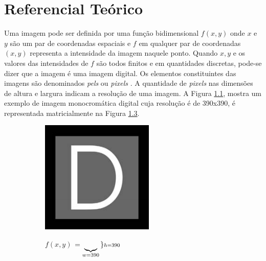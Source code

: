 \chapter{Referencial Teórico}

Uma imagem pode ser definida por uma função bidimensional $f(x,y)$ onde $x$ e $y$ são um par de coordenadas espaciais e $f$ em qualquer par de coordenadas $(x,y)$ representa a intensidade da imagem naquele ponto. Quando $x,y$ e os valores das intensidades de $f$ são todos finitos e em quantidades discretas, pode-se dizer que a imagem é uma imagem digital. Os  elementos  constituintes das imagens são denominados \emph{pels} ou \emph{pixels} \cite{Gonzalez:2006:DIP:1076432}. A quantidade de \emph{pixels} nas dimensões de altura e largura indicam a resolução de uma imagem. A Figura \ref{andressa}, mostra um exemplo de imagem monocromática digital cuja resolução é de 390x390, é representada matricialmente na Figura \ref{matriz-andressa}. 


\begin{figure}[htb]
\begin{center}
  \caption{(a) Exemplo de imagem digital (b) Representação matricial da imagem.}
  \begin{subfigure}[b]{0.6\textwidth}
  \centering
      \includegraphics[scale=0.6]{images/bw.png}
    \caption{}
    \label{andressa}
  \end{subfigure}
  \begin{subfigure}[b]{0.6\textwidth}
  \centering
    \begin{center}
	$f(x,y)$ $=
	  \underbrace{\vrule width0pt depth \dimexpr\dp0 + .3ex\relax\copy0}_{w = 390}%
	  \left.\kern-\nulldelimiterspace
	    \vphantom{\copy0}
	  \right\rbrace \scriptstyle{h = 390}
	$
	\end{center}
    \caption{}
    \label{matriz-andressa}
  \end{subfigure}
  
\end{center}

\end{figure}

